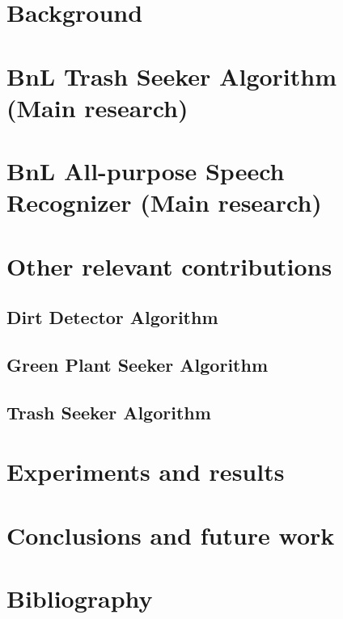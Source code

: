 \documentclass[runningheads,a4paper]{llncs}
\begin{document}
\section{Background}
\lipsum[1-3]

\section{BnL Trash Seeker Algorithm (Main research)}
\lipsum[4-14]

\section{BnL All-purpose Speech Recognizer (Main research)}
\lipsum[15-20]

\section{Other relevant contributions}
\lipsum[21]
\subsection{Dirt Detector Algorithm}
\lipsum[22-25]
\subsection{Green Plant Seeker Algorithm}
\lipsum[25-29]
\subsection{Trash Seeker Algorithm}
\lipsum[30-34]

\section{Experiments and results}
\lipsum[35-39]

\section{Conclusions and future work}
\lipsum[40-43]

%
%

\section*{Bibliography}



%
%

\robospecs

\newpage

\newpage


\nocite{*}
\end{document}
